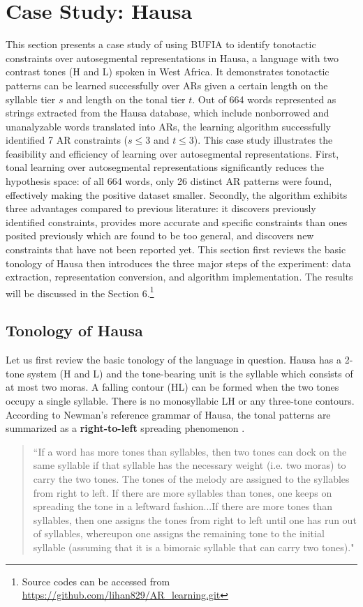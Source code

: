 \documentclass[11pt,letterpaper]{article}
\begin{document}
\section{Case Study: Hausa}
This section presents a case study of using BUFIA to identify tonotactic constraints over autosegmental representations in Hausa, a language with two contrast tones (H and L) spoken in West Africa. It demonstrates tonotactic patterns can be learned successfully over ARs given a certain length on the syllable tier \(s\) and length on the tonal tier \(t\). Out of 664 words represented as strings extracted from the Hausa database, which include nonborrowed and unanalyzable words translated into ARs, the learning algorithm successfully identified 7 AR constraints (\(s\leq3\) and \(t\leq3\)). This case study illustrates the feasibility and efficiency of learning over autosegmental representations. First, tonal learning over autosegmental representations significantly reduces the hypothesis space: of all 664 words, only 
26 distinct AR patterns were found, effectively making the positive dataset smaller. Secondly, the algorithm exhibits three advantages compared to previous literature: it discovers previously identified constraints, provides more accurate and specific constraints than ones posited previously which are found to be too general, and discovers new constraints that have not been reported yet. This section first reviews the basic tonology of Hausa then introduces the three major steps of the experiment: data extraction, representation conversion, and algorithm implementation. The results will be discussed in the Section 6.\footnote{Source codes can be accessed from \href{https://github.com/lihan829/AR_learning.git}{https://github.com/lihan829/AR\_learning.git}}

\subsection{Tonology of Hausa}
Let us first review the basic tonology of the language in question. Hausa has a 2-tone system (H and L) and the tone-bearing unit is the syllable which consists of at most two moras. A falling contour (HL) can be formed when the two tones occupy a single syllable. There is no monosyllabic LH or any three-tone contours. According to Newman's reference grammar of Hausa, the tonal patterns are summarized as a \textbf{right-to-left} spreading phenomenon \citep[p.600]{Newmanbook}.
\begin{quote}
	``If a word has more tones than syllables, then two tones can dock on the same syllable if that syllable has the necessary weight (i.e. two moras) to carry the two tones. The tones of the melody are assigned to the syllables from right to left. If there are more syllables than tones, one keeps on spreading the tone in a leftward fashion...If there are more tones than syllables, then one assigns the tones from right to left until one has run out of syllables, whereupon one assigns the remaining tone to the initial syllable (assuming that it is a bimoraic syllable that can carry two tones)." 
\end{quote}
\end{document}
